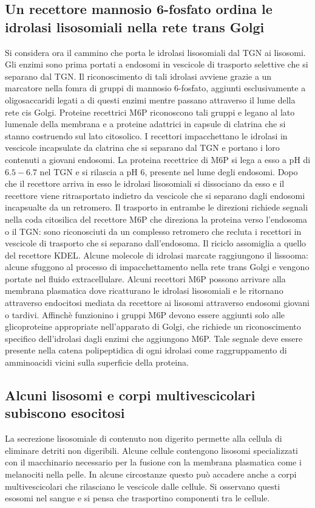 \subsection{Un recettore mannosio $\mathbf{6}$-fosfato ordina le idrolasi lisosomiali nella rete trans Golgi}
Si considera ora il cammino che porta le idrolasi lisosomiali dal TGN ai lisosomi. Gli enzimi sono prima portati a endosomi in vescicole di trasporto selettive che si separano dal 
TGN. Il riconoscimento di tali idrolasi avviene grazie a un marcatore nella fomra di gruppi di mannosio $6$-fosfato, aggiunti esclusivamente a oligosaccaridi legati a  di questi
enzimi mentre passano attraverso il lume della rete cis Golgi. Proteine recettrici M6P riconoscono tali gruppi e legano al lato lumenale della membrana e a proteine adattrici in 
capsule di clatrina che si stanno costruendo sul lato citosolico. I recettori impacchettano le idrolasi in vescicole incapsulate da clatrina che si separano dal TGN e portano i loro
contenuti a giovani endosomi. La proteina recettrice di M6P si lega a esso a pH di $6.5-6.7$ nel TGN e si rilascia a pH $6$, presente nel lume degli endosomi. Dopo che il recettore
arriva in esso le idrolasi lisosomiali si dissociano da esso e il recettore viene ritrasportato indietro da vescicole che si separano dagli endosomi incapsualte da un retromero. 
Il trasporto in entrambe le direzioni richiede segnali nella coda citosilica del recettore M6P che direziona la proteina verso l'endosoma o il TGN: sono riconosciuti da un complesso 
retromero che recluta i recettori in vescicole di trasporto che si separano dall'endosoma. Il riciclo assomiglia a quello del recettore KDEL. Alcune molecole di idrolasi marcate 
raggiungono il lissooma: alcune sfuggono al processo di impacchettamento nella rete trans Golgi e vengono portate nel fluido extracellulare. Alcuni recettori M6P possono arrivare alla
membrana plasmatica dove ricatturano le idrolasi lisosomiali e le ritornano attraverso endocitosi mediata da recettore ai lisosomi attraverso endosomi giovani o tardivi. Affinch\`e
funzionino i gruppi M6P devono essere aggiunti solo alle glicoproteine appropriate nell'apparato di Golgi, che richiede un riconoscimento specifico dell'idrolasi dagli enzimi che 
aggiungono M6P. Tale segnale deve essere presente nella catena polipeptidica di ogni idrolasi come raggruppamento di amminoacidi vicini sulla superficie della proteina. 
\subsection{Alcuni lisosomi e corpi multivescicolari subiscono esocitosi}
La secrezione lisosomiale di contenuto non digerito permette alla cellula di eliminare detriti non digeribili. Alcune cellule contengono lisosomi specializzati con il macchinario 
necessario per la fusione con la membrana plasmatica come i melanociti nella pelle. In alcune circostanze questo pu\`o accadere anche a corpi multivescicolari che rilasciano le
vescicole dalle cellule. Si osservano questi esosomi nel sangue e si pensa che trasportino componenti tra le cellule. 
